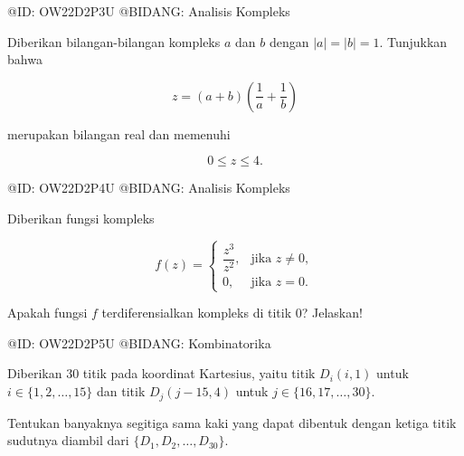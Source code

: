 @ID: OW22D2P3U
@BIDANG: Analisis Kompleks

Diberikan bilangan-bilangan kompleks $a$ dan $b$ dengan $|a|=|b|=1$. Tunjukkan bahwa

$$
z=(a+b)\left(\frac1a+\frac1b\right)
$$

merupakan bilangan real dan memenuhi

$$
0\le z\le4.
$$

@ID: OW22D2P4U
@BIDANG: Analisis Kompleks

Diberikan fungsi kompleks

$$
f(z)=
\begin{cases}
\dfrac{z^3}{z^2}, & \text{jika } z\neq0,\\
0, & \text{jika } z=0.
\end{cases}
$$

Apakah fungsi $f$ terdiferensialkan kompleks di titik $0$? Jelaskan!

@ID: OW22D2P5U
@BIDANG: Kombinatorika

Diberikan $30$ titik pada koordinat Kartesius, yaitu titik $D_i(i,1)$ untuk $i\in\{1,2,\ldots,15\}$ dan titik $D_j(j-15,4)$ untuk $j\in\{16,17,\ldots,30\}$.

Tentukan banyaknya segitiga sama kaki yang dapat dibentuk dengan ketiga titik sudutnya diambil dari $\{D_1,D_2,\ldots,D_{30}\}$.